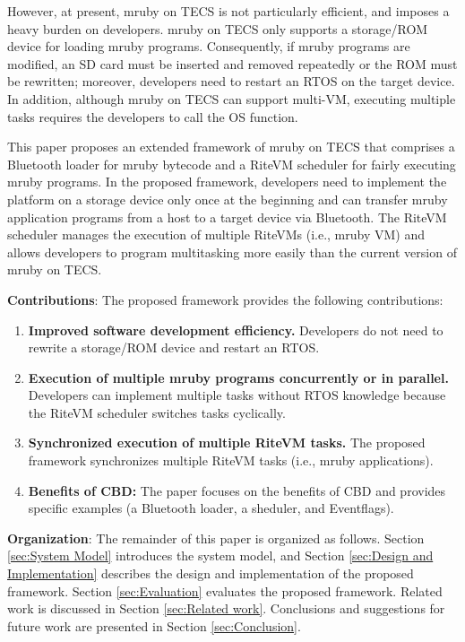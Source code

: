 \documentclass[conference]{IEEEtran/IEEEtran/IEEEtran}
\begin{document}
However, at present, mruby on TECS is not particularly efficient, and imposes a heavy burden on developers.
mruby on TECS only supports a storage/ROM device for loading mruby programs.
Consequently, if mruby programs are modified, an SD card must be inserted and removed repeatedly or the ROM must be rewritten; moreover, developers need to restart an RTOS on the target device.
In addition, although mruby on TECS can support multi-VM, executing multiple tasks requires the developers to call the OS function.

This paper proposes an extended framework of mruby on TECS that comprises a Bluetooth loader for mruby bytecode and a RiteVM scheduler for fairly executing mruby programs.
In the proposed framework, developers need to implement the platform on a storage device only once at the beginning and can transfer mruby application programs from a host to a target device via Bluetooth.
The RiteVM scheduler manages the execution of multiple RiteVMs (i.e., mruby VM) and allows developers to program multitasking more easily than the current version of mruby on TECS.

{\bf Contributions}: The proposed framework provides the following contributions:
\begin{enumerate}
\item {\bf Improved software development efficiency.}
Developers do not need to rewrite a storage/ROM device and restart an RTOS.
\item {\bf Execution of multiple mruby programs concurrently or in parallel.}
Developers can implement multiple tasks without RTOS knowledge because the RiteVM scheduler switches tasks cyclically.
\item {\bf Synchronized execution of multiple RiteVM tasks.}
The proposed framework synchronizes multiple RiteVM tasks (i.e., mruby applications).
\item {\bf Benefits of CBD:}
The paper focuses on the benefits of CBD and provides specific examples (a Bluetooth loader, a sheduler, and Eventflags).
\end{enumerate}

{\bf Organization}: The remainder of this paper is organized as follows.
Section \ref{sec:System Model} introduces the system model, and Section \ref{sec:Design and Implementation} describes the design and implementation of the proposed framework.
Section \ref{sec:Evaluation} evaluates the proposed framework.
Related work is discussed in Section \ref{sec:Related work}.
Conclusions and suggestions for future work are presented in Section \ref{sec:Conclusion}.
\end{document}
